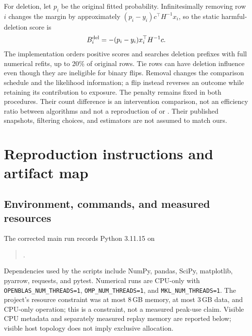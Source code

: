 For deletion, let $p_i$ be the original fitted probability. Infinitesimally removing row $i$ changes the margin by approximately $(p_i-y_i)c^\top H^{-1}x_i$, so the static harmful-deletion score is
\begin{equation}
 B_i^{\rm del}=-(p_i-y_i)x_i^\top H^{-1}c.
\label{eq:deletion}
\end{equation}
The implementation orders positive scores and searches deletion prefixes with full numerical refits, up to 20\% of original rows. Tie rows can have deletion influence even though they are ineligible for binary flips. Removal changes the comparison schedule and the likelihood information; a flip instead reverses an outcome while retaining its contribution to exposure. The penalty remains fixed in both procedures. Their count difference is an intervention comparison, not an efficiency ratio between algorithms and not a reproduction of \citet{huang2025dropping} or \citet{broderick2020automatic}. Their published snapshots, filtering choices, and estimators are not assumed to match ours.

\section{Reproduction instructions and artifact map}
\label{app:reproduction}
\subsection{Environment, commands, and measured resources}
The corrected main run records Python 3.11.15 on
\begin{quote}\small{}.\end{quote}
Dependencies used by the scripts include NumPy, pandas, SciPy, matplotlib, pyarrow, requests, and pytest. Numerical runs are CPU-only with \texttt{OPENBLAS\_NUM\_THREADS=1}, \texttt{OMP\_NUM\_THREADS=1}, and \texttt{MKL\_NUM\_THREADS=1}. The project's resource constraint was at most 8\,GB memory, at most 3\,GB data, and CPU-only operation; this is a constraint, not a measured peak-use claim. Visible CPU metadata and separately measured replay memory are reported below; visible host topology does not imply exclusive allocation.

